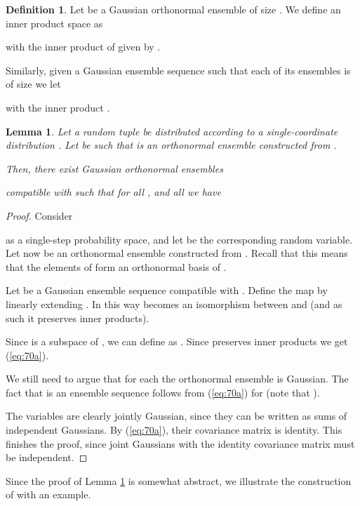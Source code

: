 \documentclass{daj}
\newcommand{\1}{\mathbbm{1}}
\theoremstyle{plain}
\newtheorem{lemma}[theorem]{Lemma}
\theoremstyle{definition}
\newtheorem{definition}[theorem]{Definition}
\begin{document}
\begin{definition}
\label{def:vg}
Let  be a Gaussian 
orthonormal ensemble of size . We define
an inner product space  as

with the inner product of  given by
.

Similarly, given a Gaussian ensemble sequence 
 such that each of its ensembles is of size 
we let

with the inner product .
\end{definition}

\begin{lemma}\label{lem:cov-xg}
Let a random tuple  be distributed according
to a single-coordinate distribution 
.
Let  be such
that  is an orthonormal ensemble constructed 
from .

Then, there exist Gaussian orthonormal ensembles
 
compatible with  such
that for all , and all  we have

\end{lemma}
\begin{proof}
Consider
 
as a single-step probability space, and let  
be the corresponding random variable.
Let now  be an orthonormal ensemble constructed
from . Recall that this means that
the elements of  form an orthonormal basis
of .

Let  be a Gaussian ensemble sequence compatible
with .
Define the map
 by linearly extending
.
In this way  becomes an isomorphism between 
and  (and as such it preserves inner products).

Since  is a subspace of , we can define
 as .
Since  preserves inner products we get (\ref{eq:70a}).

We still need to argue that for each  the
orthonormal ensemble  is Gaussian.
The fact that  is an ensemble sequence
follows from (\ref{eq:70a}) for  (note that ).

The variables  are clearly jointly Gaussian, 
since they can be written as sums of independent Gaussians.
By (\ref{eq:70a}), their covariance matrix is identity.
This finishes the proof, since joint Gaussians with 
the identity covariance matrix must be independent.
\end{proof}

Since the proof of Lemma \ref{lem:cov-xg} is somewhat abstract, 
we illustrate the construction of  
with an example.
\end{document}
